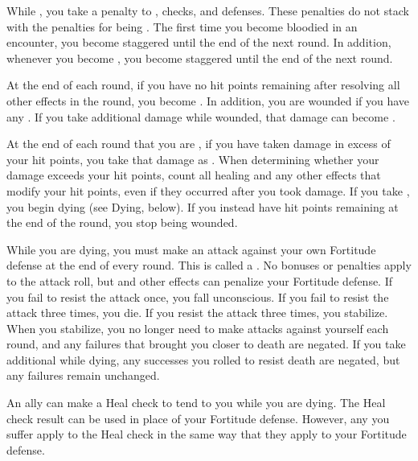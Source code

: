         \label{Staggered}
        While , you take a  penalty to , checks, and defenses.
        These penalties do not stack with the penalties for being .
        The first time you become bloodied in an encounter, you become staggered until the end of the next round.
        In addition, whenever you become , you become staggered until the end of the next round.

        \label{Wounded} At the end of each round, if you have no hit points remaining after resolving all other effects in the round, you become \wounded.
        In addition, you are wounded if you have any .
        If you take additional damage while wounded, that damage can become .

        At the end of each round that you are , if you have taken damage in excess of your hit points, you take that damage as .
        When determining whether your damage exceeds your hit points, count all healing and any other effects that modify your hit points, even if they occurred after you took damage.
        If you take , you begin dying (see Dying, below).
        If you instead have hit points remaining at the end of the round, you stop being wounded.

        \label{Dying} While you are dying, you must make an attack against your own Fortitude defense at the end of every round.
        This is called a .
        No bonuses or penalties apply to the attack roll, but  and other effects can penalize your Fortitude defense.
        If you fail to resist the attack once, you fall unconscious.
        If you fail to resist the attack three times, you die.
        If you resist the attack three times, you stabilize.
        When you stabilize, you no longer need to make attacks against yourself each round, and any failures that brought you closer to death are negated.
        If you take additional  while dying, any successes you rolled to resist death are negated, but any failures remain unchanged.

        An ally can make a Heal check to tend to you while you are dying.
        The Heal check result can be used in place of your Fortitude defense.
        However, any  you suffer apply to the Heal check in the same way that they apply to your Fortitude defense.

